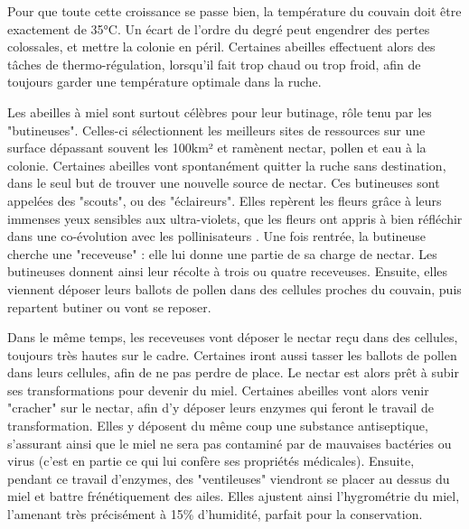 			Pour que toute cette croissance se passe bien, la température du couvain doit être exactement de 35°C. Un écart de l'ordre du degré peut engendrer des pertes colossales, et mettre la colonie en péril. Certaines abeilles effectuent alors des tâches de thermo-régulation, lorsqu'il fait trop chaud ou trop froid, afin de toujours garder une température optimale dans la ruche.

			
			Les abeilles à miel sont surtout célèbres pour leur butinage, rôle tenu par les "butineuses". Celles-ci sélectionnent les meilleurs sites de ressources sur une surface dépassant souvent les 100km² \cite{seeley_wisdom_1995} et ramènent nectar, pollen et eau à la colonie. Certaines abeilles vont spontanément quitter la ruche sans destination, dans le seul but de trouver une nouvelle source de nectar. Ces butineuses sont appelées des "scouts", ou des "éclaireurs". Elles repèrent les fleurs grâce à leurs immenses yeux sensibles aux ultra-violets, que les fleurs ont appris à bien réfléchir dans une co-évolution avec les pollinisateurs \cite{thompson_concepts_1989}. Une fois rentrée, la butineuse cherche une "receveuse" : elle lui donne une partie de sa charge de nectar. Les butineuses donnent ainsi leur récolte à trois ou quatre receveuses. Ensuite, elles viennent déposer leurs ballots de pollen dans des cellules proches du couvain, puis repartent butiner ou vont se reposer. 
			
			Dans le même temps, les receveuses vont déposer le nectar reçu dans des cellules, toujours très hautes sur le cadre. Certaines iront aussi tasser les ballots de pollen dans leurs cellules, afin de ne pas perdre de place. Le nectar est alors prêt à subir ses transformations pour devenir du miel. Certaines abeilles vont alors venir "cracher" sur le nectar, afin d'y déposer leurs enzymes qui feront le travail de transformation. Elles y déposent du même coup une substance antiseptique, s'assurant ainsi que le miel ne sera pas contaminé par de mauvaises bactéries ou virus (c'est en partie ce qui lui confère ses propriétés médicales). Ensuite, pendant ce travail d'enzymes, des "ventileuses" viendront se placer au dessus du miel et battre frénétiquement des ailes. Elles ajustent ainsi l'hygrométrie du miel, l'amenant très précisément à 15\% d'humidité, parfait pour la conservation.
			

